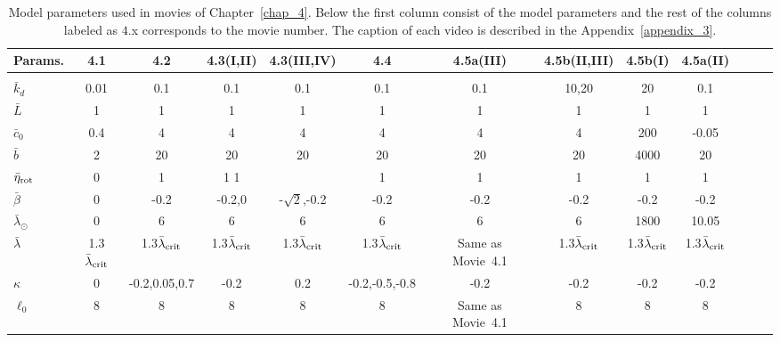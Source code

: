 	\begin{sidewaystable}
	\begin{minipage}[c][\textheight][c]{\textwidth}
		\begin{center}
			\begin{tabular}{l|cccccccccccc} Params.& 4.1 &  4.2 & 4.3(I,II) & 4.3(III,IV) & 4.4 & 4.5a(III) & 4.5b(II,III) & 4.5b(I)& 4.5a(II) \\ \hline \\
				$\bar{k}_d$  &0.01&0.1&  0.1& 0.1 &0.1&0.1&10,20&20& 0.1  \\
				$\bar{L}$  &1&1& 1 &1& 1 &1& 1 & 1& 1\\
				$\bar{c}_0$ &0.4&4 &  4& 4& 4& 4&4 &200&-0.05\\
				$\bar{b}$  &2&20& 20& 20&20& 20&20&4000&20\\
				$\bar{\eta}_{\rm rot}$ &0& 1&1 1&&  1&  1&1&1&1  \\
				$\bar{\beta}$ & 0&-0.2& -0.2,0 & -$\sqrt{2}$,-0.2&-0.2&-0.2&-0.2 &-0.2&-0.2 \\
				$\bar{\lambda}_\odot$ &0&6&  6& 6 &6&6&6&1800&10.05\\
				$\bar{\lambda}$ &1.3$\bar{\lambda}_{\rm crit}$&1.3$\bar{\lambda}_{\rm crit}$&1.3$\bar{\lambda}_{\rm crit}$  & 1.3$\bar{\lambda}_{\rm crit}$ & 1.3$\bar{\lambda}_{\rm crit}$& Same as Movie~4.1 & 1.3$\bar{\lambda}_{\rm crit}$&1.3$\bar{\lambda}_{\rm crit}$&1.3$\bar{\lambda}_{\rm crit}$  \\
				$\kappa$ &0&-0.2,0.05,0.7& -0.2 & 0.2&-0.2,-0.5,-0.8  &-0.2&-0.2&-0.2&-0.2\\
				$\ell_0$ &8&8&8 & 8 &8&Same as Movie~4.1&8 &8&8  \\
							\hline
			\end{tabular}
		\end{center}
				\caption{Model parameters used in movies of Chapter~\ref{chap_4}. Below the first column consist of the model parameters and the rest of the columns labeled as $4.$x corresponds to the movie number. The caption of each video is described in the Appendix~\ref{appendix_3}.}
						\label{supplem_table_2}
	\end{minipage}
\end{sidewaystable}

